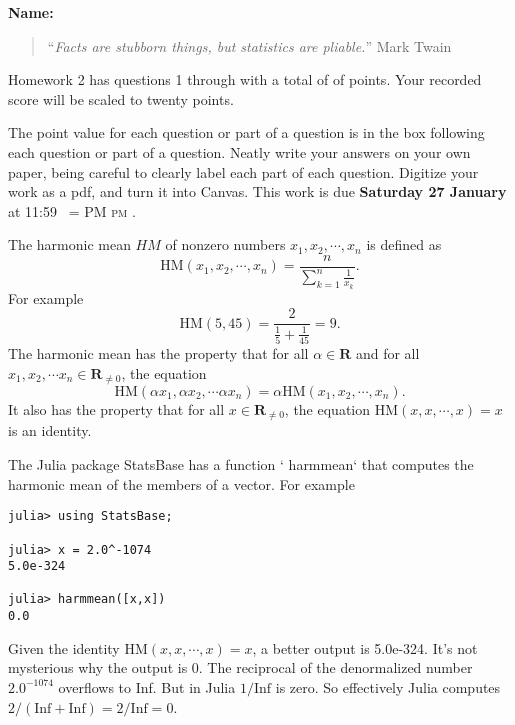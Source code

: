 \documentclass[12pt,fleqn]{exam}
\makeatletter
\newcommand{\reals}{\mathbf{R}}
\newcommand{\HM}{\mathrm{HM}}
\newcommand{\Inf}{\mathrm{Inf}}
\newcommand{\quiz}{2}
\newcommand{\term}{Spring}
\DeclareRobustCommand{\maybefakesc}[1]{%
  \ifnum\pdfstrcmp{\f@series}{\bfdefault}=\z@
    {\fontsize{\dimexpr0.8\dimexpr\f@size pt\relax}{0}\selectfont\uppercase{#1}}%
  \else
    \textsc{#1}%
  \fi
}
\newcommand\PM{\,\maybefakesc{pm}\xspace}
\makeatother
\begin{document}
\large
\vspace{0.1in}
\noindent{}
{\bf Name:}  \\
\noindent \makebox[3.0truein][l]{\textbf{Homework \quiz, \term \/ \the\year}}
\vspace{0.1in}

\begin{quote}
“\emph{Facts are stubborn things, but statistics are pliable.}”  \hfill {\sc Mark Twain} 

\end{quote}
\noindent  Homework \quiz\/  has questions 1 through  \numquestions \/ with a total of of  \numpoints\/  points. 
Your recorded score will be scaled to twenty points. 

\noindent The point
value for each question or part of a question is in the box following each question or part of a question.
Neatly write your answers on your own paper, being careful to clearly label each part of each question. Digitize your work as a pdf, and turn it into Canvas. This work is due \textbf{Saturday 27 January } at 11:59 \PM.


\vspace{0.1in}
The harmonic mean $HM$ of nonzero numbers $x_1, x_2, \cdots, x_n$ is defined as
\begin{equation*}
  \HM(x_1, x_2, \cdots, x_n) = \frac{n}{\sum_{k=1}^n \frac{1}{x_k}}.
\end{equation*}
For example
\begin{equation*}
  \HM(5,45) = \frac{2}{\frac{1}{5} + \frac{1}{45}} = 9.
\end{equation*}
The harmonic mean has the property that for all $\alpha \in \reals$ and for all $x_1, x_2, \cdots x_n \in \reals_{\neq 0}$,
the equation
\begin{equation*}
  \HM(\alpha x_1, \alpha x_2, \cdots \alpha x_n) =\alpha  \HM(x_1, x_2, \cdots, x_n).
\end{equation*}
It also has the property that for all $x \in \reals_{\neq 0}$, the equation
$  \HM(x,x, \cdots ,x ) =x$ is an identity.

The Julia package   StatsBase has a function ` harmmean` that computes the harmonic mean of the members
of a vector. For example

\begin{verbatim}
julia> using StatsBase;

julia> x = 2.0^-1074
5.0e-324

julia> harmmean([x,x])
0.0
\end{verbatim}
Given the identity $  \HM(x,x, \cdots ,x ) =x$, a better output is 5.0e-324. It's not mysterious why the output is 0.
The reciprocal of the denormalized number $2.0^{-1074}$ overflows to Inf. But in Julia $1/\Inf$ is zero. So effectively Julia computes $2/(\Inf + \Inf) = 2/\Inf =0$.
\end{document}
